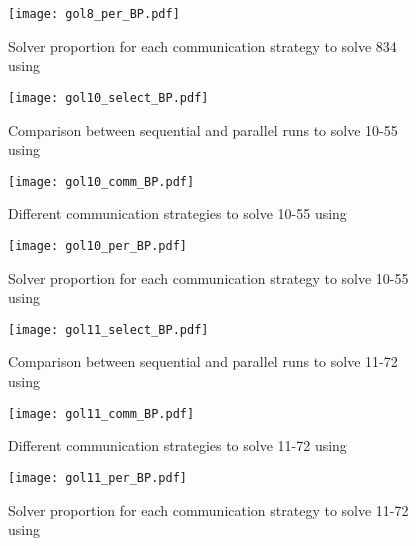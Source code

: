 \begin{figure}[!h]
\centering
\texttt{[image: gol8\_per\_BP.pdf]}
\caption{Solver proportion for each communication strategy to solve \GRP{} 834 using \posl}\label{barplot:834}
\end{figure}


\begin{figure}[!h]
\centering
\texttt{[image: gol10\_select\_BP.pdf]}
\caption{Comparison between sequential and parallel runs to solve \GRP{} 10-55 using \posl}
\end{figure}

\begin{figure}[!h]
\centering
\texttt{[image: gol10\_comm\_BP.pdf]}
\caption{Different communication strategies to solve \GRP{} 10-55 using \posl}\label{boxplot:1055comm}
\end{figure}

\begin{figure}[!h]
\centering
\texttt{[image: gol10\_per\_BP.pdf]}
\caption{Solver proportion for each communication strategy to solve \GRP{} 10-55 using \posl}\label{barplot:1055}
\end{figure}


\begin{figure}[!h]
\centering
\texttt{[image: gol11\_select\_BP.pdf]}
\caption{Comparison between sequential and parallel runs to solve \GRP{} 11-72 using \posl}
\end{figure}

\begin{figure}[!h]
\centering
\texttt{[image: gol11\_comm\_BP.pdf]}
\caption{Different communication strategies to solve \GRP{} 11-72 using \posl}\label{boxplot:1172comm}
\end{figure}

\begin{figure}[!h]
\centering
\texttt{[image: gol11\_per\_BP.pdf]}
\caption{Solver proportion for each communication strategy to solve \GRP{} 11-72 using \posl}\label{barplot:1172}
\end{figure}